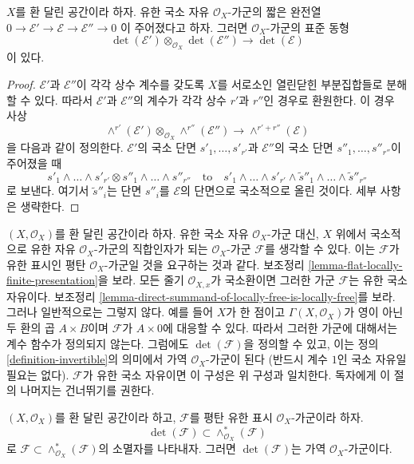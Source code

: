 \begin{lemma}
\label{lemma-det-ses}
$X$를 환 달린 공간이라 하자. 유한 국소 자유
$\mathcal{O}_X$-가군의 짧은 완전열
$0 \to \mathcal{E}' \to \mathcal{E} \to \mathcal{E}'' \to 0$
이 주어졌다고 하자. 그러면 $\mathcal{O}_X$-가군의 표준 동형
$$
\det(\mathcal{E}') \otimes_{\mathcal{O}_X}\det(\mathcal{E}'')
\longrightarrow
\det(\mathcal{E})
$$
이 있다.
\end{lemma}

\begin{proof}
$\mathcal{E}'$과 $\mathcal{E}''$이 각각 상수 계수를 갖도록 $X$를
서로소인 열린닫힌 부분집합들로 분해할 수 있다. 따라서
$\mathcal{E}'$과 $\mathcal{E}''$의 계수가 각각 상수 $r'$과
$r''$인 경우로 환원한다. 이 경우 사상
$$
\wedge^{r'}(\mathcal{E}') \otimes_{\mathcal{O}_X} \wedge^{r''}(\mathcal{E}'')
\longrightarrow
\wedge^{r' + r''}(\mathcal{E})
$$
을 다음과 같이 정의한다. $\mathcal{E}'$의 국소 단면
$s'_1, \ldots, s'_{r'}$과 $\mathcal{E}''$의 국소 단면
$s''_1, \ldots, s''_{r''}$이 주어졌을 때
$$
s'_1 \wedge \ldots \wedge s'_{r'} \otimes
s''_1 \wedge \ldots \wedge s''_{r''}
\quad\text{to}\quad
s'_1 \wedge \ldots \wedge s'_{r'} \wedge
\tilde s''_1 \wedge \ldots \wedge \tilde s''_{r''}
$$
로 보낸다. 여기서 $\tilde s''_i$는 단면 $s''_i$를
$\mathcal{E}$의 단면으로 국소적으로 올린 것이다. 세부 사항은 생략한다.
\end{proof}

\noindent
$(X, \mathcal{O}_X)$를 환 달린 공간이라 하자. 유한 국소 자유
$\mathcal{O}_X$-가군 대신, $X$ 위에서 국소적으로 유한 자유
$\mathcal{O}_X$-가군의 직합인자가 되는 $\mathcal{O}_X$-가군
$\mathcal{F}$를 생각할 수 있다. 이는 $\mathcal{F}$가 유한 표시인 평탄
$\mathcal{O}_X$-가군일 것을 요구하는 것과 같다. 보조정리
\ref{lemma-flat-locally-finite-presentation}을 보라.
모든 줄기 $\mathcal{O}_{X, x}$가 국소환이면 그러한 가군
$\mathcal{F}$는 유한 국소 자유이다. 보조정리
\ref{lemma-direct-summand-of-locally-free-is-locally-free}를 보라.
그러나 일반적으로는 그렇지 않다. 예를 들어 $X$가 한 점이고
$\Gamma(X, \mathcal{O}_X)$가 영이 아닌 두 환의 곱 $A \times B$이며
$\mathcal{F}$가 $A \times 0$에 대응할 수 있다.
따라서 그러한 가군에 대해서는 계수 함수가 정의되지 않는다.
그럼에도 $\det(\mathcal{F})$을 정의할 수 있고, 이는 정의
\ref{definition-invertible}의 의미에서 가역 $\mathcal{O}_X$-가군이 된다
(반드시 계수 $1$인 국소 자유일 필요는 없다).
$\mathcal{F}$가 유한 국소 자유이면 이 구성은 위 구성과 일치한다.
독자에게 이 절의 나머지는 건너뛰기를 권한다.

\begin{lemma}
\label{lemma-determinant-as-socle}
$(X, \mathcal{O}_X)$를 환 달린 공간이라 하고, $\mathcal{F}$를
평탄 유한 표시 $\mathcal{O}_X$-가군이라 하자.
$$
\det(\mathcal{F}) \subset
\wedge^*_{\mathcal{O}_X}(\mathcal{F})
$$
로 $\mathcal{F} \subset \wedge^*_{\mathcal{O}_X}(\mathcal{F})$의
소멸자를 나타내자. 그러면 $\det(\mathcal{F})$는 가역
$\mathcal{O}_X$-가군이다.
\end{lemma}

